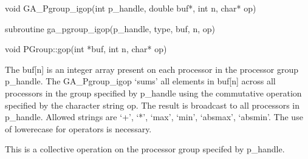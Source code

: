 \documentclass[12pt]{article}
\begin{document}

\begin{capi}
\begin{ccode}
void GA_Pgroup_igop(int p_handle, double buf*, int n, char* op)
\end{ccode}
\begin{funcargs}
\end{funcargs}
\end{capi}

\begin{fapi}
\begin{fcode}
subroutine ga_pgroup_igop(p_handle, type, buf, n, op)
\end{fcode}
\begin{funcargs}
\end{funcargs}
\end{fapi}

\begin{cxxapi}
\begin{cxxcode}
void PGroup::gop(int *buf, int n, char* op)
\end{cxxcode}
\begin{funcargs}
\end{funcargs}
\end{cxxapi}

\begin{desc}

The buf[n] is an integer array present on each processor in the processor group p_handle. The GA_Pgroup_igop `sums' all elements in buf[n] across all processors in the group specified by p_handle using the commutative operation specified by the character string op.  The result is broadcast to all processors in p_handle. Allowed strings are `+', `*', `max', `min', `absmax', `absmin'. The use of lowerecase for operators is necessary.

This is a collective operation on the processor group specifed by p_handle. 
\end{desc}
\end{document}

